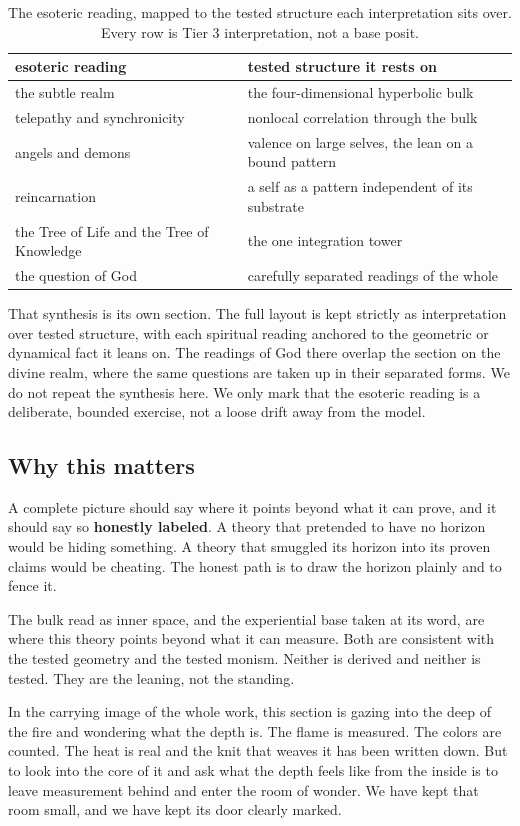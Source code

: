 \begin{table}[ht]
\centering
\begin{tabular}{@{}ll@{}}
\toprule
esoteric reading & tested structure it rests on \\
\midrule
the subtle realm & the four-dimensional hyperbolic bulk \\
telepathy and synchronicity & nonlocal correlation through the bulk \\
angels and demons & valence on large selves, the lean on a bound pattern \\
reincarnation & a self as a pattern independent of its substrate \\
the Tree of Life and the Tree of Knowledge & the one integration tower \\
the question of God & carefully separated readings of the whole \\
\bottomrule
\end{tabular}
\caption{The esoteric reading, mapped to the tested structure each interpretation sits over. Every row is Tier 3 interpretation, not a base posit.}
\label{tab:esoteric-map}
\end{table}

That synthesis is its own section. The full layout is kept strictly as interpretation over tested structure, with each spiritual reading anchored to the geometric or dynamical fact it leans on. The readings of God there overlap the section on the divine realm, where the same questions are taken up in their separated forms. We do not repeat the synthesis here. We only mark that the esoteric reading is a deliberate, bounded exercise, not a loose drift away from the model.

\subsection{Why this matters}

A complete picture should say where it points beyond what it can prove, and it should say so \textbf{honestly labeled}. A theory that pretended to have no horizon would be hiding something. A theory that smuggled its horizon into its proven claims would be cheating. The honest path is to draw the horizon plainly and to fence it.

\begin{result}
The bulk read as inner space, and the experiential base taken at its word, are where this theory points beyond what it can measure. Both are consistent with the tested geometry and the tested monism. Neither is derived and neither is tested. They are the leaning, not the standing.
\end{result}

In the carrying image of the whole work, this section is gazing into the deep of the fire and wondering what the depth is. The flame is measured. The colors are counted. The heat is real and the knit that weaves it has been written down. But to look into the core of it and ask what the depth feels like from the inside is to leave measurement behind and enter the room of wonder. We have kept that room small, and we have kept its door clearly marked.
